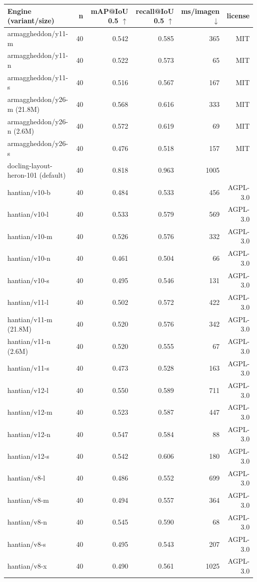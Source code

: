 \documentclass[border=2pt]{standalone}
\begin{document}
\begin{tabular}{lrrrrr}
\toprule
Engine (variant/size) & n & mAP@IoU 0.5 $\uparrow$ & recall@IoU 0.5 $\uparrow$ & ms/imagen $\downarrow$ & license \\
\midrule
armaggheddon/y11-m & 40 & 0.542 & 0.585 & 365 & MIT \\
armaggheddon/y11-n & 40 & 0.522 & 0.573 & 65 & MIT \\
armaggheddon/y11-s & 40 & 0.516 & 0.567 & 167 & MIT \\
armaggheddon/y26-m (21.8M) & 40 & 0.568 & 0.616 & 333 & MIT \\
armaggheddon/y26-n (2.6M) & 40 & 0.572 & 0.619 & 69 & MIT \\
armaggheddon/y26-s & 40 & 0.476 & 0.518 & 157 & MIT \\
docling-layout-heron-101 (default) & 40 & 0.818 & 0.963 & 1005 &  \\
hantian/v10-b & 40 & 0.484 & 0.533 & 456 & AGPL-3.0 \\
hantian/v10-l & 40 & 0.533 & 0.579 & 569 & AGPL-3.0 \\
hantian/v10-m & 40 & 0.526 & 0.576 & 332 & AGPL-3.0 \\
hantian/v10-n & 40 & 0.461 & 0.504 & 66 & AGPL-3.0 \\
hantian/v10-s & 40 & 0.495 & 0.546 & 131 & AGPL-3.0 \\
hantian/v11-l & 40 & 0.502 & 0.572 & 422 & AGPL-3.0 \\
hantian/v11-m (21.8M) & 40 & 0.520 & 0.576 & 342 & AGPL-3.0 \\
hantian/v11-n (2.6M) & 40 & 0.520 & 0.555 & 67 & AGPL-3.0 \\
hantian/v11-s & 40 & 0.473 & 0.528 & 163 & AGPL-3.0 \\
hantian/v12-l & 40 & 0.550 & 0.589 & 711 & AGPL-3.0 \\
hantian/v12-m & 40 & 0.523 & 0.587 & 447 & AGPL-3.0 \\
hantian/v12-n & 40 & 0.547 & 0.584 & 88 & AGPL-3.0 \\
hantian/v12-s & 40 & 0.542 & 0.606 & 180 & AGPL-3.0 \\
hantian/v8-l & 40 & 0.486 & 0.552 & 699 & AGPL-3.0 \\
hantian/v8-m & 40 & 0.494 & 0.557 & 364 & AGPL-3.0 \\
hantian/v8-n & 40 & 0.545 & 0.590 & 68 & AGPL-3.0 \\
hantian/v8-s & 40 & 0.495 & 0.543 & 207 & AGPL-3.0 \\
hantian/v8-x & 40 & 0.490 & 0.561 & 1025 & AGPL-3.0 \\

\end{tabular}
\end{document}
